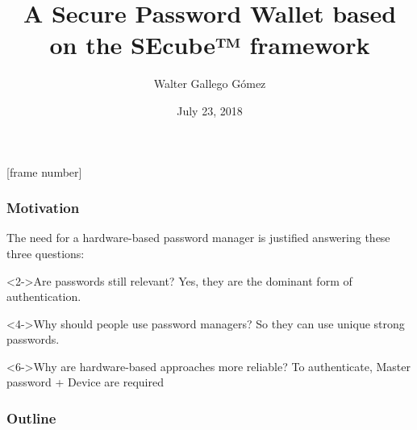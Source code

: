 \documentclass[14pt,usenames,dvipsnames]{beamer}
\title[About Beamer] %
{A Secure Password Wallet based on the SEcube™ framework}
\author %
{Walter Gallego Gómez}
\institute[VFU] %
{
 Department of control and computer engineering\\
Politecnico di Torino
}
\date[VLC 2014] %
{July 23, 2018}
\begin{document}
[frame number]{}


{ 
\begin{frame}[noframenumbering]
\titlepage
\end{frame}
} %


\begin{frame}
\frametitle{Motivation}
The need for a hardware-based password manager is justified answering these three questions:


\begin{block}<2->{Are passwords still relevant?}
 {Yes, they are the dominant form of authentication.}
\end{block}

\begin{block}<4->{Why should people use password managers?}
 {So they can use unique strong passwords.}
\end{block}

\begin{block}<6->{Why are hardware-based approaches more reliable?}
 {To authenticate, Master password + Device are required}
\end{block}

%    
%
%    
%
%

\end{frame}



\begin{frame}
\frametitle{Outline}
\tableofcontents
\end{frame}
\end{document}
